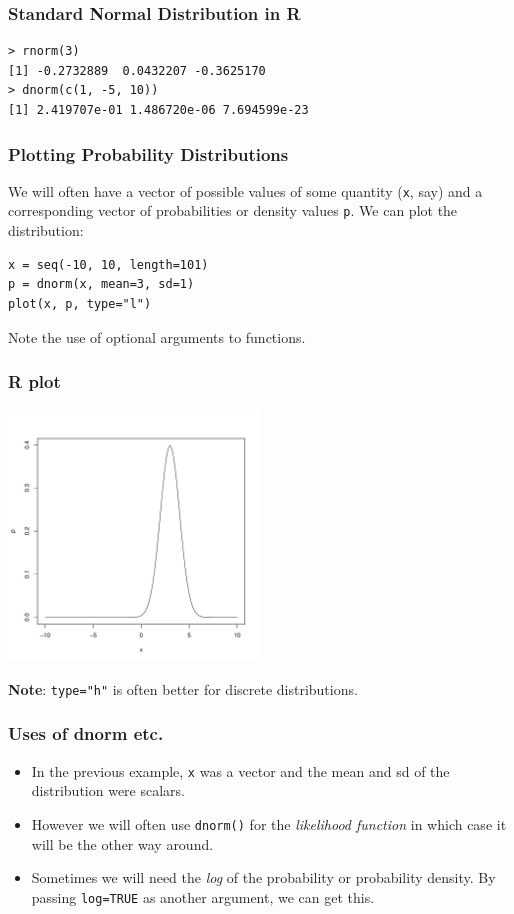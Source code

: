 \documentclass{beamer}
\begin{document}
\begin{frame}[fragile]
\frametitle{Standard Normal Distribution in R}
\begin{verbatim}
> rnorm(3)
[1] -0.2732889  0.0432207 -0.3625170
> dnorm(c(1, -5, 10))
[1] 2.419707e-01 1.486720e-06 7.694599e-23
\end{verbatim}
\end{frame}


\begin{frame}[fragile]
\frametitle{Plotting Probability Distributions}
We will often have a vector of possible values of some
quantity (\texttt{x}, say) and a corresponding vector of
probabilities or density values
\texttt{p}. We can plot the distribution:
\begin{verbatim}
x = seq(-10, 10, length=101)
p = dnorm(x, mean=3, sd=1)
plot(x, p, type="l")
\end{verbatim}
Note the use of optional arguments to functions.
\end{frame}


\begin{frame}[fragile]
\frametitle{R plot}

\begin{center}
\includegraphics[width=0.5\textwidth]{images/R_normal.pdf}
\end{center}
\vspace{-1.5em}
{\bf Note}: \texttt{type="h"} is often better for
discrete distributions.
\end{frame}

\begin{frame}[fragile]
\frametitle{Uses of dnorm etc.}
\begin{itemize}
\item In the previous example, \texttt{x} was a vector
and the mean and sd of the distribution were scalars.\pause
\item However we will often use \texttt{dnorm()}
for the {\em likelihood function} in which case it will be the
other way around.\pause
\item Sometimes we will need the {\em log} of the probability
or probability density. By passing \texttt{log=TRUE}
as another argument, we can get this.
\end{itemize}

\end{frame}
\end{document}
